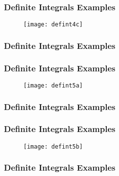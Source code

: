 \documentclass{beamer}
\begin{document}
	
	\begin{frame}
		\frametitle{Definite Integrals Examples}
		\begin{figure}
			\centering
			\texttt{[image: defint4c]}
			
		\end{figure}
		
	\end{frame}
	\begin{frame}
		\frametitle{Definite Integrals Examples}
		
	\end{frame}
	
	
	\begin{frame}
		\frametitle{Definite Integrals Examples}
		\begin{figure}
			\centering
			\texttt{[image: defint5a]}
			
		\end{figure}
		
	\end{frame}
	\begin{frame}
		\frametitle{Definite Integrals Examples}
		
	\end{frame}
	
	\begin{frame}
		\frametitle{Definite Integrals Examples}
		\begin{figure}
			\centering
			\texttt{[image: defint5b]}
			
		\end{figure}
		
	\end{frame}
	\begin{frame}
		\frametitle{Definite Integrals Examples}
		
	\end{frame}
	
\end{document}
